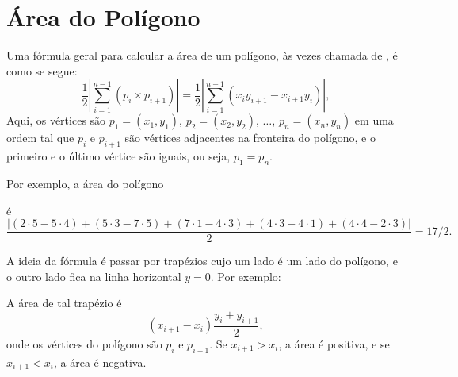 \section{Área do Polígono}

Uma fórmula geral para calcular a área
de um polígono, às vezes chamada de ,
é como se segue: 
\[\frac{1}{2} |\sum_{i=1}^{n-1} (p_i \times p_{i+1})| =
\frac{1}{2} |\sum_{i=1}^{n-1} (x_i y_{i+1} - x_{i+1} y_i)|, \]
Aqui, os vértices são
$p_1=(x_1,y_1)$, $p_2=(x_2,y_2)$, $\ldots$, $p_n=(x_n,y_n)$
em uma ordem tal que
$p_i$ e $p_{i+1}$ são vértices adjacentes na fronteira
do polígono,
e o primeiro e o último vértice são iguais, ou seja, $p_1=p_n$.

Por exemplo, a área do polígono
\begin{center}
\end{center}
é
\[\frac{|(2\cdot5-5\cdot4)+(5\cdot3-7\cdot5)+(7\cdot1-4\cdot3)+(4\cdot3-4\cdot1)+(4\cdot4-2\cdot3)|}{2} = 17/2.\]

A ideia da fórmula é passar por trapézios
cujo um lado é um lado do polígono,
e o outro lado fica na linha horizontal $y=0$.
Por exemplo:
\begin{center}
\end{center}
A área de tal trapézio é
\[(x_{i+1}-x_{i}) \frac{y_i+y_{i+1}}{2},\]
onde os vértices do polígono são $p_i$ e $p_{i+1}$.
Se $x_{i+1}>x_{i}$, a área é positiva,
e se $x_{i+1}<x_{i}$, a área é negativa.

